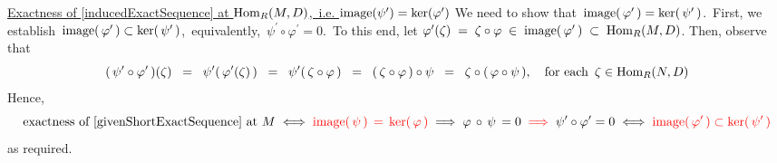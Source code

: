 \vskip 0.50cm
\noindent
\underline{Exactness of \eqref{inducedExactSequence} at $\textnormal{Hom}_{R}(M,D)$,\, i.e. $\textnormal{image}(\psi^{\prime}) = \ker(\varphi^{\prime})$}
\vskip 0.25cm
\noindent
We need to show that \,$\textnormal{image}(\,\varphi^{\prime}\,) = \ker(\,\psi^{\prime}\,)$.\,
First, we establish \,$\textnormal{image}(\,\varphi^{\prime}\,) \subset \ker(\,\psi^{\prime}\,)$,\,
equivalently, \,$\psi^{\prime} \circ \varphi^{\prime} = 0$.\,
To this end, let
$\varphi^{\prime}(\zeta) \;=\; \zeta \circ \varphi \;\in\; \textnormal{image}(\,\varphi^{\prime}\,) \;\subset\; \textnormal{Hom}_{R}(M,D)$.
Then, observe that
\begin{equation*}
(\,\psi^{\prime}\circ\varphi^{\prime}\,)(\zeta)
\;\; = \;\;
	\psi^{\prime}(\,\varphi^{\prime}(\zeta)\,)
\;\; = \;\;
	\psi^{\prime}(\,\zeta \circ \varphi\,)
\;\; = \;\;
	(\,\zeta \circ \varphi\,) \circ \psi
\;\; = \;\;
	\zeta \circ (\,\varphi \circ \psi\,),
\quad
	\textnormal{for each \,$\zeta \in \textnormal{Hom}_{R}(N,D)$}
\end{equation*}
Hence,
\begin{equation*}
\textnormal{exactness of \eqref{givenShortExactSequence} at $M$}
\; \Longleftrightarrow \;
	{\color{red}\textnormal{image}(\,\psi\,) \,=\, \ker(\,\varphi\,)}
\; \Longrightarrow \;
	\varphi \,\circ\, \psi \,= 0
\;\; {\color{red}\Longrightarrow} \;\;
	\psi^{\prime} \circ \varphi^{\prime} = 0
\; \Longleftrightarrow \;
	{\color{red}\textnormal{image}(\,\varphi^{\prime}\,) \subset \ker(\,\psi^{\prime}\,)}
\end{equation*}
as required.

